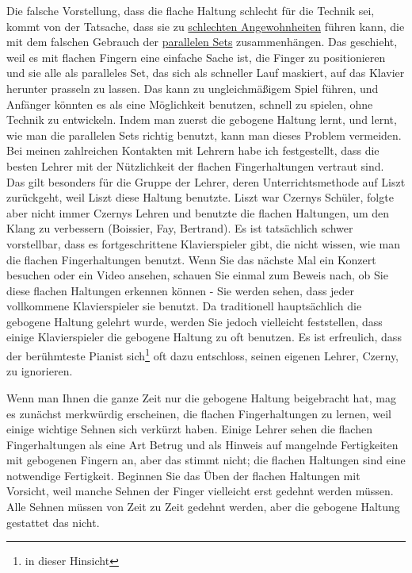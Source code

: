 Die falsche Vorstellung, dass die flache Haltung schlecht für die Technik sei, kommt von der Tatsache, dass sie zu \hyperref[c1ii22]{schlechten Angewohnheiten} führen kann, die mit dem falschen Gebrauch der \hyperref[c1ii11]{parallelen Sets} zusammenhängen.
Das geschieht, weil es mit flachen Fingern eine einfache Sache ist, die Finger zu positionieren und sie alle als paralleles Set, das sich als schneller Lauf maskiert, auf das Klavier herunter prasseln zu lassen.
Das kann zu ungleichmäßigem Spiel führen, und Anfänger könnten es als eine Möglichkeit benutzen, schnell zu spielen, ohne Technik zu entwickeln.
Indem man zuerst die gebogene Haltung lernt, und lernt, wie man die parallelen Sets richtig benutzt, kann man dieses Problem vermeiden.
Bei meinen zahlreichen Kontakten mit Lehrern habe ich festgestellt, dass die besten Lehrer mit der Nützlichkeit der flachen Fingerhaltungen vertraut sind.
Das gilt besonders für die Gruppe der Lehrer, deren Unterrichtsmethode auf Liszt zurückgeht, weil Liszt diese Haltung benutzte.
Liszt war Czernys Schüler, folgte aber nicht immer Czernys Lehren und benutzte die flachen Haltungen, um den Klang zu verbessern (Boissier, Fay, Bertrand).
Es ist tatsächlich schwer vorstellbar, dass es fortgeschrittene Klavierspieler gibt, die nicht wissen, wie man die flachen Fingerhaltungen benutzt.
Wenn Sie das nächste Mal ein Konzert besuchen oder ein Video ansehen, schauen Sie einmal zum Beweis nach, ob Sie diese flachen Haltungen erkennen können - Sie werden sehen, dass jeder vollkommene Klavierspieler sie benutzt.
Da traditionell hauptsächlich die gebogene Haltung gelehrt wurde, werden Sie jedoch vielleicht feststellen, dass einige Klavierspieler die gebogene Haltung zu oft benutzen.
Es ist erfreulich, dass der berühmteste Pianist sich\footnote{in dieser Hinsicht} oft dazu entschloss, seinen eigenen Lehrer, Czerny, zu ignorieren.

Wenn man Ihnen die ganze Zeit nur die gebogene Haltung beigebracht hat, mag es zunächst merkwürdig erscheinen, die flachen Fingerhaltungen zu lernen, weil einige wichtige Sehnen sich verkürzt haben.
Einige Lehrer sehen die flachen Fingerhaltungen als eine Art Betrug und als Hinweis auf mangelnde Fertigkeiten mit gebogenen Fingern an, aber das stimmt nicht; die flachen Haltungen sind eine notwendige Fertigkeit.
Beginnen Sie das Üben der flachen Haltungen mit Vorsicht, weil manche Sehnen der Finger vielleicht erst gedehnt werden müssen.
Alle Sehnen müssen von Zeit zu Zeit gedehnt werden, aber die gebogene Haltung gestattet das nicht.

